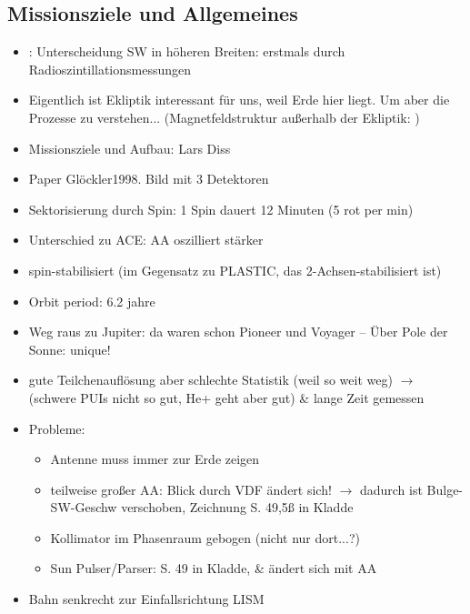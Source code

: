 \documentclass[]{article}
\begin{document}
	\subsection{Missionsziele und Allgemeines}
	\begin{itemize}
		\item  \cite[6.1.7]{prlss_2004}: Unterscheidung SW in höheren Breiten: erstmals durch Radioszintillationsmessungen
		\item Eigentlich ist Ekliptik interessant für uns, weil Erde hier liegt. Um aber die Prozesse zu verstehen... (Magnetfeldstruktur außerhalb der Ekliptik: \cite[ch. 6.2.3]{prlss_2004})
		\item Missionsziele und Aufbau: Lars Diss
		\item Paper Glöckler1998. Bild mit 3 Detektoren
		\item Sektorisierung durch Spin: 1 Spin dauert 12 Minuten (5 rot per min)
		\item Unterschied zu ACE: AA oszilliert stärker
		\item spin-stabilisiert (im Gegensatz zu PLASTIC, das 2-Achsen-stabilisiert ist)
		\item Orbit period: 6.2 jahre
		\item Weg raus zu Jupiter: da waren schon Pioneer und Voyager -- Über Pole der Sonne: unique!
		\item gute Teilchenauflösung aber schlechte Statistik (weil so weit weg) $\rightarrow$ (schwere PUIs nicht so gut, He+ geht aber gut) \& lange Zeit gemessen
		\item Probleme:
		\begin{itemize}
			\item Antenne muss immer zur Erde zeigen
			\item teilweise großer AA: Blick durch VDF ändert sich! $\rightarrow$ dadurch ist Bulge-SW-Geschw verschoben, Zeichnung S. 49,5ß in Kladde
			\item Kollimator im Phasenraum gebogen (nicht nur dort...?)
			\item Sun Pulser/Parser: S. 49 in Kladde, \& ändert sich mit AA
		\end{itemize}
	\item Bahn senkrecht zur Einfallsrichtung LISM
	\end{itemize}
\end{document}
